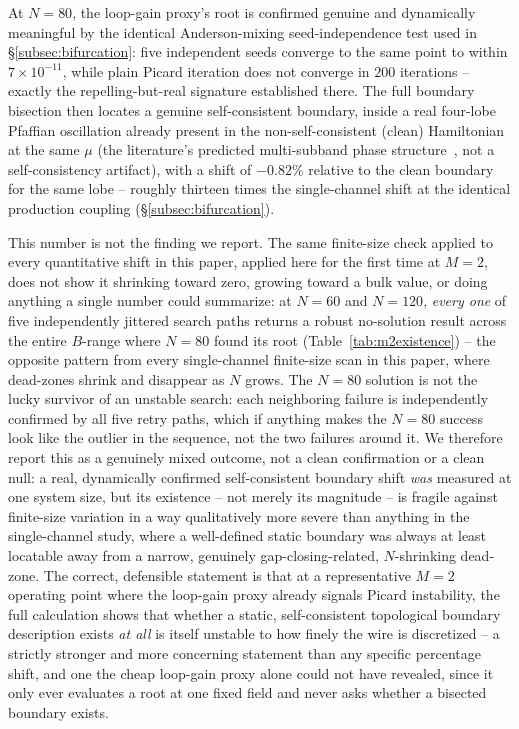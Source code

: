 \documentclass[aps,physrev,reprint,superscriptaddress,amsmath,amssymb,floatfix]{revtex4-2}
\begin{document}
At $N=80$, the loop-gain proxy's root is confirmed genuine and
dynamically meaningful by the identical Anderson-mixing seed-independence
test used in \S\ref{subsec:bifurcation}: five independent seeds converge to the
same point to within $7\times10^{-11}$, while plain Picard iteration does
not converge in $200$ iterations -- exactly the repelling-but-real
signature established there. The full boundary bisection then locates a
genuine self-consistent boundary, inside a real four-lobe Pfaffian
oscillation already present in the non-self-consistent (clean)
Hamiltonian at the same $\mu$ (the literature's predicted multi-subband
phase structure~\cite{potterlee2010,potterlee2011,lutchyn2011,stanescu2011},
not a self-consistency artifact), with a shift of $-0.82\%$ relative to the
clean boundary for the same lobe -- roughly thirteen times the
single-channel shift at the identical production coupling
(\S\ref{subsec:bifurcation}).

This number is not the finding we report. The same finite-size check
applied to every quantitative shift in this paper, applied here for the
first time at $M=2$, does not show it shrinking toward zero, growing
toward a bulk value, or doing anything a single number could summarize:
at $N=60$ and $N=120$, \emph{every one} of five independently jittered
search paths returns a robust no-solution result across the entire
$B$-range where $N=80$ found its root (Table~\ref{tab:m2existence}) --
the opposite pattern from every single-channel finite-size scan in this
paper, where dead-zones shrink and disappear as $N$ grows. The $N=80$
solution is not the lucky survivor of an unstable search: each
neighboring failure is independently confirmed by all five retry paths,
which if anything makes the $N=80$ success look like the outlier in the
sequence, not the two failures around it. We therefore report this as a
genuinely mixed outcome, not a clean confirmation or a clean null: a
real, dynamically confirmed self-consistent boundary shift \emph{was}
measured at one system size, but its existence -- not merely its
magnitude -- is fragile against finite-size variation in a way
qualitatively more severe than anything in the single-channel study,
where a well-defined static boundary was always at least locatable away
from a narrow, genuinely gap-closing-related, $N$-shrinking dead-zone.
The correct, defensible statement is that at a representative $M=2$
operating point where the loop-gain proxy already signals Picard
instability, the full calculation shows that whether a static,
self-consistent topological boundary description exists \emph{at all} is
itself unstable to how finely the wire is discretized -- a strictly
stronger and more concerning statement than any specific percentage
shift, and one the cheap loop-gain proxy alone could not have revealed,
since it only ever evaluates a root at one fixed field and never asks
whether a bisected boundary exists.
\end{document}
